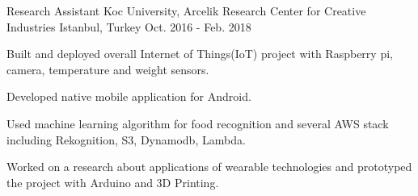 \begin{cventries}
  \cventry
    {Research Assistant} %
    {Koc University, Arcelik Research Center for Creative Industries} %
    {Istanbul, Turkey} %
    {Oct. 2016 - Feb. 2018} %
    {
      \begin{cvitems} %
       	\item {Built and deployed overall Internet of Things(IoT) project with Raspberry pi, camera, temperature and weight sensors.  }
        \item {Developed native mobile application for Android. }
       	\item {Used machine learning algorithm for food recognition and several AWS stack including Rekognition, S3, Dynamodb, Lambda.} 
         \item {Worked on a research about applications of wearable technologies and prototyped the project with Arduino and 3D Printing.  }
      \end{cvitems}
    }
\begin{comment}
  \cventry
    {Work \& Study} %
    {Koc University, Computer Information Technology Department} %
    {Istanbul, Turkey} %
    {OCt. 2015 - May. 2016} %
    {
      \begin{cvitems} %
        \item {Applied and tested Google Cloud technologies across the campus.}
      \end{cvitems}
    }

\end{comment}
\end{cventries}
